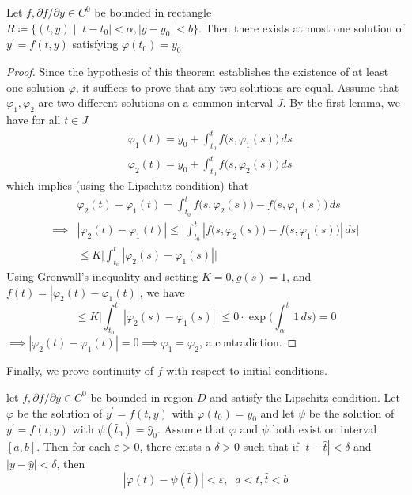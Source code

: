 \documentclass{article}
\newcounter{theorem}[section]
\begin{document}
    \begin{theorem}
      \label{thm:local-uniqueness-on-a-rectangle}
    Let $f, \partial f/ \partial y \in C^0$ be bounded in rectangle $R \coloneqq \{(t, y) \;|\; |t-t_0| < \alpha, |y - y_0| < b\}$. Then there exists at most one solution of $y^\prime = f(t, y)$ satisfying $\varphi(t_0) = y_0$. 
    \end{theorem}
    \begin{proof}
    Since the hypothesis of this theorem establishes the existence of at least one solution $\varphi$, it suffices to prove that any two solutions are equal. Assume that $\varphi_1, \varphi_2$ are two different solutions on a common interval $J$. By the first lemma, we have for all $t \in J$
    \begin{align*}
        &\varphi_1 (t) = y_0 + \int_{t_0}^t f\big(s, \varphi_1 (s)\big) \,ds \\
        &\varphi_2 (t) = y_0 + \int_{t_0}^t f\big(s, \varphi_2 (s)\big) \,ds
    \end{align*}
    which implies (using the Lipschitz condition) that
    \begin{align*}
        & \varphi_2 (t) - \varphi_1 (t) = \int_{t_0}^t f\big(s, \varphi_2 (s)\big) - f\big(s, \varphi_1 (s)\big) \, ds \\
        \implies & |\varphi_2 (t) - \varphi_1 (t)| \leq \bigg|\int_{t_0}^t |f\big(s, \varphi_2 (s)\big) - f\big(s, \varphi_1 (s)\big)| \, ds\bigg| \\
        & \leq K \bigg| \int_{t_0}^t |\varphi_2 (s) - \varphi_1 (s) | \bigg|
    \end{align*}
    Using Gronwall's inequality and setting $K=0, g(s) = 1$, and $f(t) = |\varphi_2 (t) - \varphi_1 (t)|$, we have
    \begin{equation}
      \leq K \bigg| \int_{t_0}^t |\varphi_2 (s) - \varphi_1 (s) | \bigg| \leq 0 \cdot \exp \bigg( \int_{\alpha}^t 1\,ds \bigg) = 0
    \end{equation}
    $\implies |\varphi_2 (t) - \varphi_1 (t)| = 0 \implies \varphi_1 = \varphi_2$, a contradiction. 
    \end{proof}

    Finally, we prove continuity of $f$ with respect to initial conditions. 
    \begin{theorem}
      \label{thm:continuous-dependence-on-initial-conditions}
    let $f, \partial f/ \partial y \in C^0$ be bounded in region $D$ and satisfy the Lipschitz condition. Let $\varphi$ be the solution of $y^\prime = f(t, y)$ with $\varphi(t_0) = y_0$ and let $\psi$ be the solution of $y^\prime = f(t, y)$ with $\psi(\hat{t}_0) = \hat{y}_0$. Assume that $\varphi$ and $\psi$ both exist on interval $[a, b]$. Then for each $\varepsilon > 0$, there exists a $\delta > 0$ such that if $|t - \hat{t}| < \delta$ and $|y - \hat{y}| < \delta$, then 
    \begin{equation}
      |\varphi(t) - \psi(\hat{t})| < \varepsilon, \;\; a < t, \hat{t} < b
    \end{equation}
    \end{theorem}
\end{document}
